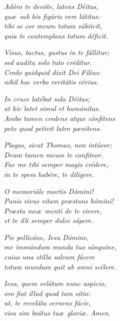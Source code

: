 
\emph{\strofa Adóro te devóte, latens Déitas,\\
qu\ae\ sub his figúris vere látitas:\\
tibi se cor meum totum súbiicit,\\
quia te contemplans totum déficit.}

\spazio

\emph{\strofa Visus, tactus, gustus in te fállitur;\\
sed auditu solo tuto créditur.\\
Credo quidquid dixit Dei Filius:\\
nihil hoc verbo veritátis vérius.}

\spazio

\emph{\strofa In cruce latébat sola Déitas;\\
at hic latet simul et humánitas.\\
Ambo tamen credens atque cónfitens\\
peto quod petivit latro p\ae nitens.}

\spazio

\emph{\strofa Plagas, sicut Thomas, non intúeor;\\
Deum tamen meum te confiteor.\\
Fac me tibi semper magis crédere,\\
in te spem habére, te diligere.}

\spazio

\emph{\strofa O memoriále mortis Dómini!\\
Panis vivus vitam pr\ae stans hómini!\\
Pr\ae sta me\ae\ menti de te vivere,\\
et te illi semper dulce sápere.}

\spazio

\emph{\strofa Pie pellicáne, Iesu Dómine,\\
me immúndum munda tuo sánguine,\\
cuius una stilla salvum fácere\\
totum mundum quit ab omni scélere.}

\spazio

\emph{\strofa Iesu, quem velátum nunc aspicio,\\
oro fiat illud quod tam sitio:\\
ut, te reveláta cernens fácie,\\
visu sim beátus tu\ae\ glori\ae. Amen.}

